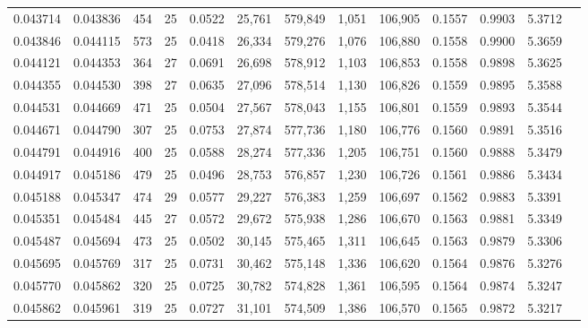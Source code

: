 \begin{tabular}{rrrrrrrrrrrrr}
0.043714 & 0.043836 & 454 &  25 &                                     0.0522 &  25,761 & 579,849 &   1,051 & 106,905 & 0.1557 & 0.9903 & 5.3712 \\
0.043846 & 0.044115 & 573 &  25 &                                     0.0418 &  26,334 & 579,276 &   1,076 & 106,880 & 0.1558 & 0.9900 & 5.3659 \\
0.044121 & 0.044353 & 364 &  27 &                                     0.0691 &  26,698 & 578,912 &   1,103 & 106,853 & 0.1558 & 0.9898 & 5.3625 \\
0.044355 & 0.044530 & 398 &  27 &                                     0.0635 &  27,096 & 578,514 &   1,130 & 106,826 & 0.1559 & 0.9895 & 5.3588 \\
0.044531 & 0.044669 & 471 &  25 &                                     0.0504 &  27,567 & 578,043 &   1,155 & 106,801 & 0.1559 & 0.9893 & 5.3544 \\
0.044671 & 0.044790 & 307 &  25 &                                     0.0753 &  27,874 & 577,736 &   1,180 & 106,776 & 0.1560 & 0.9891 & 5.3516 \\
0.044791 & 0.044916 & 400 &  25 &                                     0.0588 &  28,274 & 577,336 &   1,205 & 106,751 & 0.1560 & 0.9888 & 5.3479 \\
0.044917 & 0.045186 & 479 &  25 &                                     0.0496 &  28,753 & 576,857 &   1,230 & 106,726 & 0.1561 & 0.9886 & 5.3434 \\
0.045188 & 0.045347 & 474 &  29 &                                     0.0577 &  29,227 & 576,383 &   1,259 & 106,697 & 0.1562 & 0.9883 & 5.3391 \\
0.045351 & 0.045484 & 445 &  27 &                                     0.0572 &  29,672 & 575,938 &   1,286 & 106,670 & 0.1563 & 0.9881 & 5.3349 \\
0.045487 & 0.045694 & 473 &  25 &                                     0.0502 &  30,145 & 575,465 &   1,311 & 106,645 & 0.1563 & 0.9879 & 5.3306 \\
0.045695 & 0.045769 & 317 &  25 &                                     0.0731 &  30,462 & 575,148 &   1,336 & 106,620 & 0.1564 & 0.9876 & 5.3276 \\
0.045770 & 0.045862 & 320 &  25 &                                     0.0725 &  30,782 & 574,828 &   1,361 & 106,595 & 0.1564 & 0.9874 & 5.3247 \\
0.045862 & 0.045961 & 319 &  25 &                                     0.0727 &  31,101 & 574,509 &   1,386 & 106,570 & 0.1565 & 0.9872 & 5.3217 \\

\end{tabular}
